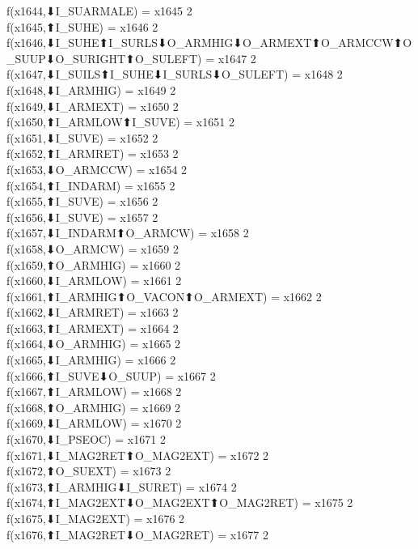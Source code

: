 f(x1644,⬇I_SUARMALE) = x1645 {2} \\
f(x1645,⬆I_SUHE) = x1646 {2} \\
f(x1646,⬇I_SUHE⬆I_SURLS⬇O_ARMHIG⬇O_ARMEXT⬆O_ARMCCW⬆O_SUUP⬇O_SURIGHT⬆O_SULEFT) = x1647 {2} \\
f(x1647,⬇I_SUILS⬆I_SUHE⬇I_SURLS⬇O_SULEFT) = x1648 {2} \\
f(x1648,⬇I_ARMHIG) = x1649 {2} \\
f(x1649,⬇I_ARMEXT) = x1650 {2} \\
f(x1650,⬆I_ARMLOW⬆I_SUVE) = x1651 {2} \\
f(x1651,⬇I_SUVE) = x1652 {2} \\
f(x1652,⬆I_ARMRET) = x1653 {2} \\
f(x1653,⬇O_ARMCCW) = x1654 {2} \\
f(x1654,⬆I_INDARM) = x1655 {2} \\
f(x1655,⬆I_SUVE) = x1656 {2} \\
f(x1656,⬇I_SUVE) = x1657 {2} \\
f(x1657,⬇I_INDARM⬆O_ARMCW) = x1658 {2} \\
f(x1658,⬇O_ARMCW) = x1659 {2} \\
f(x1659,⬆O_ARMHIG) = x1660 {2} \\
f(x1660,⬇I_ARMLOW) = x1661 {2} \\
f(x1661,⬆I_ARMHIG⬆O_VACON⬆O_ARMEXT) = x1662 {2} \\
f(x1662,⬇I_ARMRET) = x1663 {2} \\
f(x1663,⬆I_ARMEXT) = x1664 {2} \\
f(x1664,⬇O_ARMHIG) = x1665 {2} \\
f(x1665,⬇I_ARMHIG) = x1666 {2} \\
f(x1666,⬆I_SUVE⬇O_SUUP) = x1667 {2} \\
f(x1667,⬆I_ARMLOW) = x1668 {2} \\
f(x1668,⬆O_ARMHIG) = x1669 {2} \\
f(x1669,⬇I_ARMLOW) = x1670 {2} \\
f(x1670,⬇I_PSEOC) = x1671 {2} \\
f(x1671,⬇I_MAG2RET⬆O_MAG2EXT) = x1672 {2} \\
f(x1672,⬆O_SUEXT) = x1673 {2} \\
f(x1673,⬆I_ARMHIG⬇I_SURET) = x1674 {2} \\
f(x1674,⬆I_MAG2EXT⬇O_MAG2EXT⬆O_MAG2RET) = x1675 {2} \\
f(x1675,⬇I_MAG2EXT) = x1676 {2} \\
f(x1676,⬆I_MAG2RET⬇O_MAG2RET) = x1677 {2} \\
